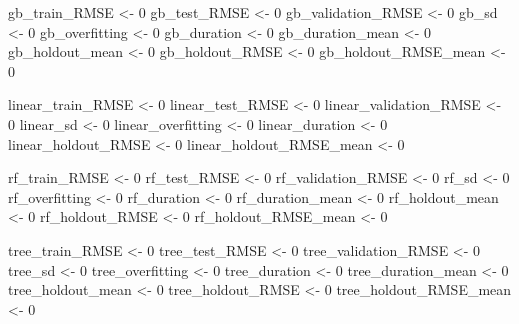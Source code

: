 \documentclass[
]{book}
\newenvironment{Shaded}{\begin{snugshade}}{\end{snugshade}}
\newcommand{\DecValTok}[1]{\textcolor[rgb]{0.00,0.00,0.81}{#1}}
\newcommand{\NormalTok}[1]{#1}
\newcommand{\OtherTok}[1]{\textcolor[rgb]{0.56,0.35,0.01}{#1}}
\begin{document}
\begin{Shaded}
\begin{Highlighting}[]
\NormalTok{gb\_train\_RMSE }\OtherTok{\textless{}{-}} \DecValTok{0}
\NormalTok{gb\_test\_RMSE }\OtherTok{\textless{}{-}} \DecValTok{0}
\NormalTok{gb\_validation\_RMSE }\OtherTok{\textless{}{-}} \DecValTok{0}
\NormalTok{gb\_sd }\OtherTok{\textless{}{-}} \DecValTok{0}
\NormalTok{gb\_overfitting }\OtherTok{\textless{}{-}} \DecValTok{0}
\NormalTok{gb\_duration }\OtherTok{\textless{}{-}} \DecValTok{0}
\NormalTok{gb\_duration\_mean }\OtherTok{\textless{}{-}} \DecValTok{0}
\NormalTok{gb\_holdout\_mean }\OtherTok{\textless{}{-}} \DecValTok{0}
\NormalTok{gb\_holdout\_RMSE }\OtherTok{\textless{}{-}} \DecValTok{0}
\NormalTok{gb\_holdout\_RMSE\_mean }\OtherTok{\textless{}{-}} \DecValTok{0}

\NormalTok{linear\_train\_RMSE }\OtherTok{\textless{}{-}} \DecValTok{0}
\NormalTok{linear\_test\_RMSE }\OtherTok{\textless{}{-}} \DecValTok{0}
\NormalTok{linear\_validation\_RMSE }\OtherTok{\textless{}{-}} \DecValTok{0}
\NormalTok{linear\_sd }\OtherTok{\textless{}{-}} \DecValTok{0}
\NormalTok{linear\_overfitting }\OtherTok{\textless{}{-}} \DecValTok{0}
\NormalTok{linear\_duration }\OtherTok{\textless{}{-}} \DecValTok{0}
\NormalTok{linear\_holdout\_RMSE }\OtherTok{\textless{}{-}} \DecValTok{0}
\NormalTok{linear\_holdout\_RMSE\_mean }\OtherTok{\textless{}{-}} \DecValTok{0}

\NormalTok{rf\_train\_RMSE }\OtherTok{\textless{}{-}} \DecValTok{0}
\NormalTok{rf\_test\_RMSE }\OtherTok{\textless{}{-}} \DecValTok{0}
\NormalTok{rf\_validation\_RMSE }\OtherTok{\textless{}{-}} \DecValTok{0}
\NormalTok{rf\_sd }\OtherTok{\textless{}{-}} \DecValTok{0}
\NormalTok{rf\_overfitting }\OtherTok{\textless{}{-}} \DecValTok{0}
\NormalTok{rf\_duration }\OtherTok{\textless{}{-}} \DecValTok{0}
\NormalTok{rf\_duration\_mean }\OtherTok{\textless{}{-}} \DecValTok{0}
\NormalTok{rf\_holdout\_mean }\OtherTok{\textless{}{-}} \DecValTok{0}
\NormalTok{rf\_holdout\_RMSE }\OtherTok{\textless{}{-}} \DecValTok{0}
\NormalTok{rf\_holdout\_RMSE\_mean }\OtherTok{\textless{}{-}} \DecValTok{0}

\NormalTok{tree\_train\_RMSE }\OtherTok{\textless{}{-}} \DecValTok{0}
\NormalTok{tree\_test\_RMSE }\OtherTok{\textless{}{-}} \DecValTok{0}
\NormalTok{tree\_validation\_RMSE }\OtherTok{\textless{}{-}} \DecValTok{0}
\NormalTok{tree\_sd }\OtherTok{\textless{}{-}} \DecValTok{0}
\NormalTok{tree\_overfitting }\OtherTok{\textless{}{-}} \DecValTok{0}
\NormalTok{tree\_duration }\OtherTok{\textless{}{-}} \DecValTok{0}
\NormalTok{tree\_duration\_mean }\OtherTok{\textless{}{-}} \DecValTok{0}
\NormalTok{tree\_holdout\_mean }\OtherTok{\textless{}{-}} \DecValTok{0}
\NormalTok{tree\_holdout\_RMSE }\OtherTok{\textless{}{-}} \DecValTok{0}
\NormalTok{tree\_holdout\_RMSE\_mean }\OtherTok{\textless{}{-}} \DecValTok{0}


\end{Highlighting}
\end{Shaded}
\end{document}
